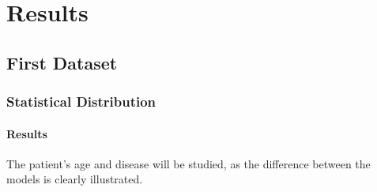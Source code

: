 
\chapter{Results}
\label{ch:results}

\section{First Dataset}


\subsection{Statistical Distribution}

\subsubsection{Results}


The patient's age and disease will be studied, as the difference between the models is clearly illustrated.

